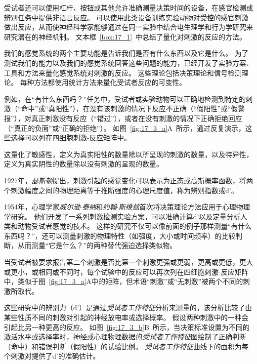受试者还可以使用杠杆、按钮或其他允许准确测量决策时间的设备，在感官检测或辨别任务中提供非语言反应。 
可以使用此类设备训练实验动物对受控的感官刺激做出反应，从而使神经科学家能够通过在同一实验中结合电生理学和行为学研究来研究潜在的神经机制。
文本框~\ref{box:17_1}~中总结了量化对刺激的反应的方法。


\begin{proposition} \label{box:17_1}
	
	\quad \quad 我们的感觉系统的两个主要功能是告诉我们是否有什么东西以及它是什么。
	为了测试我们的能力以及我们的感觉系统回答这些问题的能力，已经开发了实验方案、工具和方法来量化感觉系统对刺激的反应。
	这些理论包括决策理论和信号检测理论。
	每种方法都使用统计方法来量化受试者反应的可变性。
	
	\quad \quad 例如，在“有什么东西吗？”任务中，受试者或实验动物可以正确地检测到特定的刺激（“命中”或“真阳性”），在没有该刺激的情况下反应不正确（“假阳性”或“假警报”），对真正刺激没有反应（“错过”），或者在没有刺激的情况下正确拒绝回应（“真正的负面”或“正确的拒绝”）。
	如图~\ref{fig:17_3_a}A~所示，通过反复演示，这些选择可以列在四细胞刺激-反应矩阵中。
	
	\quad \quad 这量化了敏感性，定义为真实阳性的数量除以所呈现的刺激的数量，以及特异性，定义为真实阴性的数量除以没有刺激的呈现的数量。
	
	\quad \quad 1927年，\textit{瑟斯顿}提出，刺激引起的感觉变化可以表示为正态或高斯概率函数，将两个刺激幅度之间的物理距离等于推断强度的心理尺度值，称为辨别指数或d'。
	
	\quad \quad 1954年，心理学家\textit{威尔逊$\cdot$泰纳}和\textit{约翰$\cdot$斯维兹}首次将决策理论方法应用于心理物理学研究。
	他们开发了一系列刺激检测实验方案，可以准确计算d'以及定量分析人类和动物受试者感觉的技术。
	这样的研究不仅可以像前面的例子那样测量“有什么东西吗？”，还可以测量刺激的物理特性（如强度，大小或时间频率）的比较判断，从而测量“它是什么？”的两种替代强迫选择类似物。
	
	\quad \quad 当受试者被要求报告第二个刺激是否比第一个刺激更强或更弱，更高或更低，更大或更小，或相同或不同时，每个试验中的反应可以再次列在四细胞刺激-反应矩阵中，类似于图~\ref{fig:17_3_a}A中的矩阵，但术语“刺激”或“无刺激”被两个不同的刺激所取代。
	
	\quad \quad 这些研究中的辨别力（d'）是通过\textit{受试者工作特征}分析来测量的，该分析比较了由某些性质不同的刺激对引起的神经放电率或选择概率。
	假设两种刺激中的一种会引起比另一种更高的反应。
	如图~\ref{fig:17_3_b}B~所示，当决策标准设置为不同的激活水平或选择率时，神经或心理物理数据的\textit{受试者工作特征}图绘制了正确判断（命中）和错误判断（假阳性）的试验比例。
	\textit{受试者工作特征}曲线下的面积为每个刺激对提供了d'的准确估计。
	

\end{proposition}
